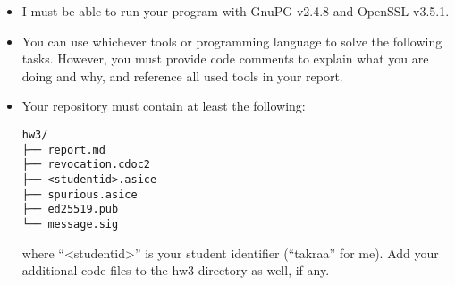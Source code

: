 \documentclass{homework}
\begin{document}
\begin{itemize}
  \item I must be able to run your program with GnuPG v2.4.8 and OpenSSL v3.5.1\footnotemark{}.
  \item You can use whichever tools or programming language to solve the following tasks.
  However, you must provide code comments to explain what you are doing and why, and reference all used tools in your report.
  \item Your repository must contain at least the following:
  \begin{Verbatim}
hw3/
├── report.md
├── revocation.cdoc2
├── <studentid>.asice
├── spurious.asice
├── ed25519.pub
└── message.sig
  \end{Verbatim}
  where \enquote{<studentid>} is your student identifier (\enquote{takraa} for me).
  Add your additional code files to the hw3 directory as well, if any.
\end{itemize}
\end{document}
